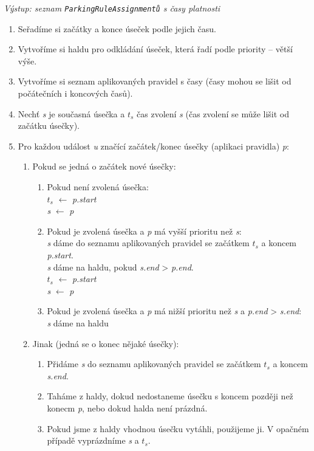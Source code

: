 \textit{Výstup: seznam \texttt{ParkingRuleAssignmentů} s časy platnosti}
\begin{enumerate}
  \item Seřadíme si začátky a konce úseček podle jejich času.
  \item Vytvoříme si haldu pro odkládání úseček, která řadí podle priority -- větší výše.
  \item Vytvoříme si seznam aplikovaných pravidel s časy (časy mohou se lišit od počátečních i koncových časů).
  \item Nechť \textit{s} je současná úsečka a \textit{$t_s$} čas zvolení \textit{s} (čas zvolení se může lišit od začátku úsečky).
  \item Pro každou událost \textit{u} značící začátek/konec úsečky (aplikaci pravidla) \textit{p}:
  \begin{enumerate}
    \item Pokud se jedná o začátek nové úsečky:
    \begin{enumerate}
      \item Pokud není zvolená úsečka:\\
            \textit{$t_s$} $\leftarrow$ \textit{p.start}\\
            \textit{s} $\leftarrow$ \textit{p}
      \item Pokud je zvolená úsečka a \textit{p} má vyšší prioritu než \textit{s}:\\
            \textit{s} dáme do seznamu aplikovaných pravidel se začátkem \textit{$t_s$} a koncem \textit{p.start}.\\
            \textit{s} dáme na haldu, pokud \textit{s.end} > \textit{p.end}.\\
            \textit{$t_s$} $\leftarrow$ \textit{p.start}\\
            \textit{s} $\leftarrow$ \textit{p}
      \item Pokud je zvolená úsečka a \textit{p} má nižší prioritu než \textit{s} a \textit{p.end} > \textit{s.end}:\\
            \textit{s} dáme na haldu
    \end{enumerate}
    \item Jinak (jedná se o konec nějaké úsečky):
    \begin{enumerate}
      \item Přidáme \textit{s} do seznamu aplikovaných pravidel se začátkem \textit{$t_s$} a koncem \textit{s.end}.
      \item Taháme z haldy, dokud nedostaneme úsečku s koncem později než konecm \textit{p}, nebo dokud halda není prázdná.
      \item Pokud jsme z haldy vhodnou úsečku vytáhli, použijeme ji. V opačném případě vyprázdníme \textit{s} a \textit{$t_s$}.
    \end{enumerate}
  \end{enumerate}
\end{enumerate}

